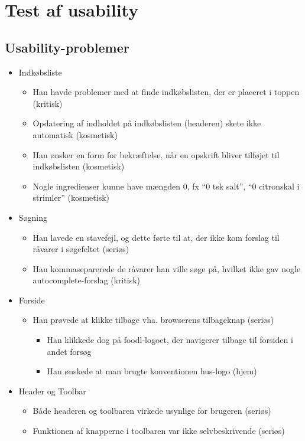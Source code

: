 \section{Test af usability}
\label{sec:usability}

\subsection{Usability-problemer}
 \begin{itemize}
 \item Indkøbsliste
  \begin{itemize}
  \item Han havde problemer med at finde indkøbslisten, der er placeret i toppen (kritisk)
  \item Opdatering af indholdet på indkøbslisten (headeren) skete ikke automatisk (kosmetisk)
  \item Han ønsker en form for bekræftelse, når en opskrift bliver tilføjet til indkøbslisten (kosmetisk)
  \item Nogle ingredienser kunne have mængden 0, fx “0 tsk salt”, “0 citronskal i strimler” (kosmetisk)
  \end{itemize}
 \item Søgning
  \begin{itemize}
  \item Han lavede en stavefejl, og dette førte til at, der ikke kom forslag til råvarer i søgefeltet (seriøs)
  \item Han kommaseparerede de råvarer han ville søge på, hvilket ikke gav nogle autocomplete-forslag (kritisk)
  \end{itemize}
 \item Forside
  \begin{itemize}
  \item Han prøvede at klikke tilbage vha. browserens tilbageknap (seriøs)
   \begin{itemize}
   \item Han klikkede dog på foodl-logoet, der navigerer tilbage til forsiden i andet forsøg 
   \item Han ønskede at man brugte konventionen hus-logo (hjem)
   \end{itemize}
  \end{itemize}
 \item Header og Toolbar
  \begin{itemize}
  \item Både headeren og toolbaren virkede usynlige for brugeren (seriøs)
  \item Funktionen af knapperne i toolbaren var ikke selvbeskrivende (seriøs)

\end{itemize}
\end{itemize}
